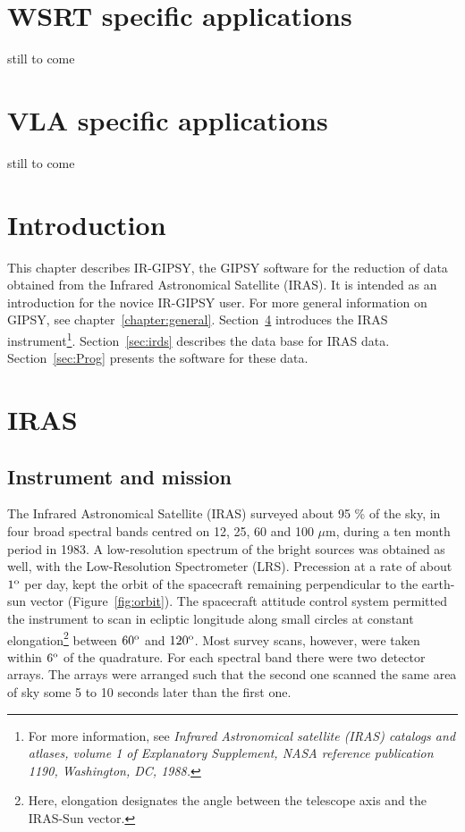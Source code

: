 \section{WSRT specific applications}
\label{sec:WSRT}

still to come

\section{VLA specific applications}
\label{sec:VLA}

still to come

\label{chapter:IRAS}

\section{Introduction}

This chapter describes IR-GIPSY, the GIPSY software for the reduction of
data obtained from the Infrared Astronomical Satellite (IRAS).  It is
intended as an introduction for the novice IR-GIPSY user.  For more
general information on GIPSY, see chapter~\ref{chapter:general}. 
Section~\ref{sec:IRAS} introduces the IRAS instrument\footnote{For more
information, see {\em Infrared Astronomical satellite (IRAS) catalogs
and atlases, volume 1 of Explanatory Supplement, NASA reference
publication 1190, Washington, DC, 1988.}}.  Section~\ref{sec:irds}
describes the data base for IRAS data.  Section~\ref{sec:Prog} presents
the software for these data. 

\section{IRAS}
\label{sec:IRAS}

\subsection{Instrument and mission}
\label{ssec:IandM}

The Infrared Astronomical Satellite (IRAS) surveyed about 95 \% of the
sky, in four broad spectral bands centred on 12, 25, 60 and 100 $\mu$m,
during a ten month period in 1983.  A low-resolution spectrum of the
bright sources was obtained as well, with the Low-Resolution
Spectrometer (LRS).  Precession at a rate of about $\rm 1^o$ per day,
kept the orbit of the spacecraft remaining perpendicular to the
earth-sun vector (Figure~\ref{fig:orbit}).  The spacecraft attitude
control system permitted the instrument to scan in ecliptic longitude
along small circles at constant elongation\footnote{Here, elongation
designates the angle between the telescope axis and the IRAS-Sun
vector.} between $\rm 60^o$ and $\rm 120^o$.  Most survey scans,
however, were taken within $\rm 6^o$ of the quadrature.  For each
spectral band there were two detector arrays.  The arrays were arranged
such that the second one scanned the same area of sky some 5 to 10
seconds later than the first one. 

